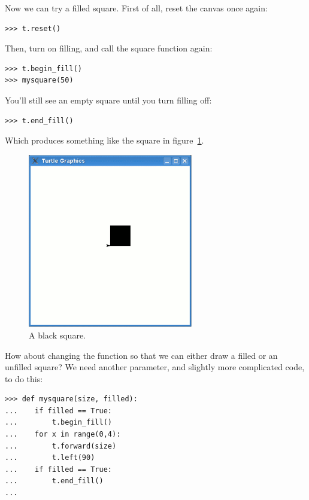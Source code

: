 \noindent
Now we can try a filled square.  First of all, reset the canvas once again:

\begin{listing}
\begin{verbatim}
>>> t.reset()
\end{verbatim}
\end{listing}

\noindent
Then, turn on filling, and call the square function again:

\begin{listing}
\begin{verbatim}
>>> t.begin_fill()
>>> mysquare(50)
\end{verbatim}
\end{listing}

\noindent
You'll still see an empty square until you turn filling off:

\begin{listing}
\begin{verbatim}
>>> t.end_fill()
\end{verbatim}
\end{listing}

\noindent
Which produces something like the square in figure~\ref{fig27}.

\begin{figure}
\begin{center}
\includegraphics[width=72mm]{eps/figure27.eps}
\end{center}
\caption{A black square.}\label{fig27}
\end{figure}

How about changing the function so that we can either draw a filled or an unfilled square? We need another parameter, and slightly more complicated code, to do this:

\begin{listing}
\begin{verbatim}
>>> def mysquare(size, filled):
...    if filled == True:
...        t.begin_fill()
...    for x in range(0,4):
...        t.forward(size)
...        t.left(90)
...    if filled == True:
...        t.end_fill()
...
\end{verbatim}
\end{listing}

